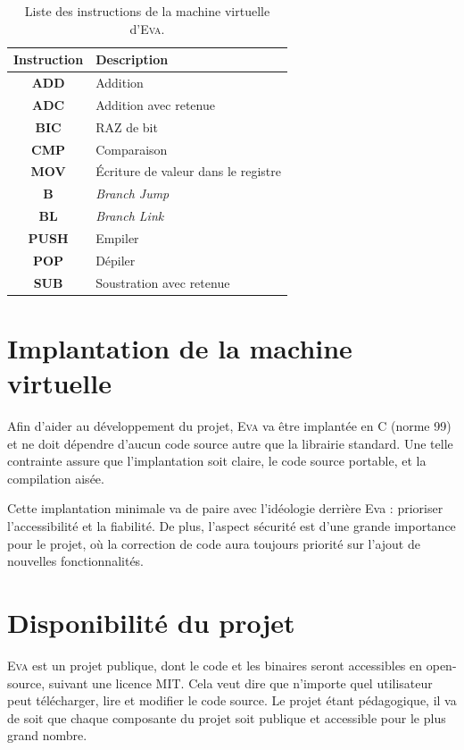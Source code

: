 \documentclass[11pt,twoside,french]{article}
\newcommand{\noun}[1]{\textsc{#1}}
\begin{document}
\begin{table}[p]
\begin{centering}
\begin{tabular}{|c|l|}
\hline
\textbf{Instruction} & \textbf{Description}\\
\hline
\hline
\textbf{ADD} & Addition\\
\hline
\textbf{ADC} & Addition avec retenue\\
\hline
\textbf{BIC} & RAZ de bit\\
\hline
\textbf{CMP} & Comparaison\\
\hline
\textbf{MOV} & Écriture de valeur dans le registre\\
\hline
\textbf{B} & \emph{Branch Jump}\\
\hline
\textbf{BL} & \emph{Branch Link}\\
\hline
\textbf{PUSH} & Empiler\\
\hline
\textbf{POP} & Dépiler\\
\hline
\textbf{SUB} & Soustration avec retenue\\
\hline
\end{tabular}
\par\end{centering}
\caption{\label{tab:opcodes}Liste des instructions de la machine virtuelle d'\noun{Eva}.}
\end{table}


\section{Implantation de la machine virtuelle}

Afin d'aider au développement du projet, \noun{Eva} va être implantée
en C (norme 99) et ne doit dépendre d'aucun code source autre que
la librairie standard. Une telle contrainte assure que l'implantation
soit claire, le code source portable, et la compilation aisée.

Cette implantation minimale va de paire avec l'idéologie derrière
Eva : prioriser l'accessibilité et la fiabilité. De plus, l'aspect
sécurité est d'une grande importance pour le projet, où la correction
de code aura toujours priorité sur l'ajout de nouvelles fonctionnalités.

\section{Disponibilité du projet}

\noun{Eva} est un projet publique, dont le code et les binaires seront
accessibles en open-source, suivant une licence MIT. Cela veut dire
que n'importe quel utilisateur peut télécharger, lire et modifier
le code source. Le projet étant pédagogique, il va de soit que chaque
composante du projet soit publique et accessible pour le plus grand nombre.
\end{document}
